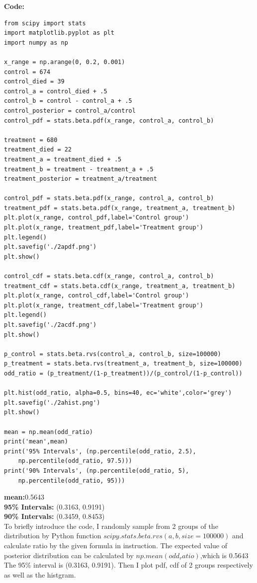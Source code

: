 \documentclass{article}
\begin{document}
\textbf{Code:}
\begin{verbatim}  
from scipy import stats
import matplotlib.pyplot as plt
import numpy as np

x_range = np.arange(0, 0.2, 0.001)
control = 674
control_died = 39
control_a = control_died + .5
control_b = control - control_a + .5
control_posterior = control_a/control
control_pdf = stats.beta.pdf(x_range, control_a, control_b)

treatment = 680
treatment_died = 22
treatment_a = treatment_died + .5
treatment_b = treatment - treatment_a + .5
treatment_posterior = treatment_a/treatment

control_pdf = stats.beta.pdf(x_range, control_a, control_b)
treatment_pdf = stats.beta.pdf(x_range, treatment_a, treatment_b)
plt.plot(x_range, control_pdf,label='Control group')
plt.plot(x_range, treatment_pdf,label='Treatment group')
plt.legend()
plt.savefig('./2apdf.png')
plt.show()

control_cdf = stats.beta.cdf(x_range, control_a, control_b)
treatment_cdf = stats.beta.cdf(x_range, treatment_a, treatment_b)
plt.plot(x_range, control_cdf,label='Control group')
plt.plot(x_range, treatment_cdf,label='Treatment group')
plt.legend()
plt.savefig('./2acdf.png')
plt.show()

p_control = stats.beta.rvs(control_a, control_b, size=100000)
p_treatment = stats.beta.rvs(treatment_a, treatment_b, size=100000)
odd_ratio = (p_treatment/(1-p_treatment))/(p_control/(1-p_control))

plt.hist(odd_ratio, alpha=0.5, bins=40, ec='white',color='grey')
plt.savefig('./2ahist.png')
plt.show()

mean = np.mean(odd_ratio)
print('mean',mean)
print('95% Intervals', (np.percentile(odd_ratio, 2.5), 
	np.percentile(odd_ratio, 97.5)))
print('90% Intervals', (np.percentile(odd_ratio, 5), 
	np.percentile(odd_ratio, 95)))
\end{verbatim}

\textbf{mean:}0.5643\\
\textbf{95\% Intervals:} (0.3163, 0.9191)\\
\textbf{90\% Intervals:} (0.3459, 0.8453)\\

To briefly introduce the code, I randomly sample from 2 groups of the distribution by Python function $scipy.stats.beta.rvs(a,b,size=100000)$ and calculate ratio by the given formula in instruction. The expected value of posterior distribution can be calculated by $np.mean(odd_ratio)$,which is 0.5643 The 95\% interval is (0.3163, 0.9191). Then I plot pdf, cdf of 2 groups respectively as well as the histgram.\\
\end{document}
